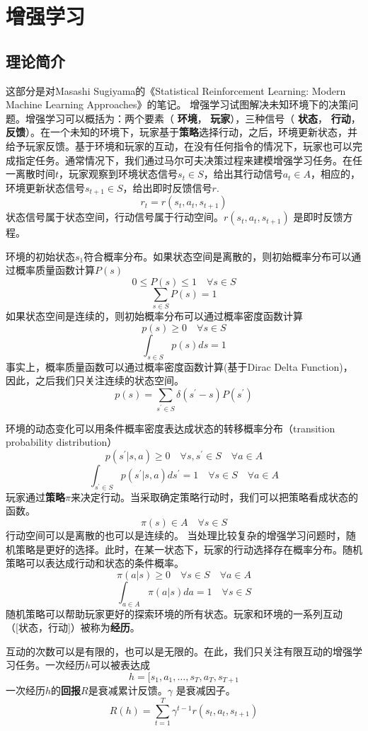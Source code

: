 \part{增强学习}
\chapter{理论简介} 
这部分是对Masashi Sugiyama的《Statistical Reinforcement Learning: Modern Machine Learning Approaches》的笔记。
增强学习试图解决未知环境下的决策问题。增强学习可以概括为：两个要素（ \textbf{环境}， \textbf{玩家}），三种信号（ \textbf{状态}， \textbf{行动}， \textbf{反馈}）。在一个未知的环境下，玩家基于\textbf{策略}选择行动，之后，环境更新状态，并给予玩家反馈。基于环境和玩家的互动，在没有任何指令的情况下，玩家也可以完成指定任务。通常情况下，我们通过马尔可夫决策过程来建模增强学习任务。在任一离散时间$t$，玩家观察到环境状态信号$s_t \in S$，给出其行动信号$a_t \in A$，相应的，环境更新状态信号$s_{t+1} \in S$，给出即时反馈信号$r$.
$$r_t = r(s_t,a_t,s_{t+1})$$
状态信号属于状态空间，行动信号属于行动空间。$r(s_t,a_t,s_{t+1})$ 是即时反馈方程。

环境的初始状态$s_1$符合概率分布。如果状态空间是离散的，则初始概率分布可以通过概率质量函数计算$P(s)$
$$0 \leq P(s) \leq 1 \quad  \forall s \in S $$
$$\sum_{s \in S } P(s) = 1$$
如果状态空间是连续的，则初始概率分布可以通过概率密度函数计算
$$ p(s) \geq 0 \quad  \forall s \in S $$
$$\int_{s \in S} p(s) ds = 1 $$
事实上，概率质量函数可以通过概率密度函数计算(基于Dirac Delta Function)，因此，之后我们只关注连续的状态空间。
$$p(s) = \sum_{s^\prime \in S} \delta(s^\prime - s)P(s^\prime)$$

环境的动态变化可以用条件概率密度表达成状态的转移概率分布（transition probability distribution）
$$p(s^\prime|s,a) \geq 0 \quad  \forall s,s^\prime \in S \quad  \forall a \in A $$
$$\int_{s^\prime \in S} p(s^\prime|s,a) ds^\prime = 1  \quad  \forall s \in S \quad  \forall a \in A $$
玩家通过\textbf{策略}$\pi$来决定行动。当采取确定策略行动时，我们可以把策略看成状态的函数。
$$\pi(s) \in A \quad  \forall s \in S $$
行动空间可以是离散的也可以是连续的。
当处理比较复杂的增强学习问题时，随机策略是更好的选择。此时，在某一状态下，玩家的行动选择存在概率分布。随机策略可以表达成行动和状态的条件概率。
$$\pi(a|s) \geq 0 \quad  \forall s \in S \quad  \forall a \in A $$
$$\int_{a \in A} \pi(a|s) da  = 1  \quad  \forall s \in S $$
随机策略可以帮助玩家更好的探索环境的所有状态。玩家和环境的一系列互动（[状态，行动]）被称为\textbf{经历}。

互动的次数可以是有限的，也可以是无限的。在此，我们只关注有限互动的增强学习任务。一次经历$h$可以被表达成
$$ h = [s_1,a_1,\dots,s_T,a_T,s_{T+1} $$
一次经历$h$的\textbf{回报}$R$是衰减累计反馈。$\gamma$ 是衰减因子。
$$R(h) = \sum_{t=1}^T\gamma^{t-1}r(s_t,a_t,s_{t+1})$$


